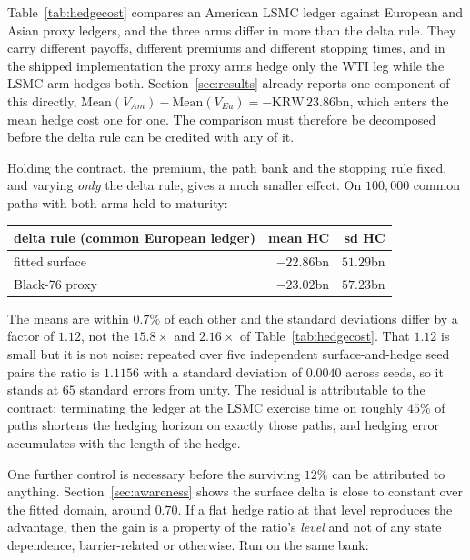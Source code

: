 \documentclass[11pt,a4paper]{article}
\begin{document}
Table~\ref{tab:hedgecost} compares an American LSMC ledger against European and Asian proxy ledgers, and the three arms differ in more than the delta rule. They carry different payoffs, different premiums and different stopping times, and in the shipped implementation the proxy arms hedge only the WTI leg while the LSMC arm hedges both. Section~\ref{sec:results} already reports one component of this directly, $\mathrm{Mean}(V_{Am})-\mathrm{Mean}(V_{Eu})=-\mathrm{KRW}\,23.86$bn, which enters the mean hedge cost one for one. The comparison must therefore be decomposed before the delta rule can be credited with any of it.

Holding the contract, the premium, the path bank and the stopping rule fixed, and varying \emph{only} the delta rule, gives a much smaller effect. On $100{,}000$ common paths with both arms held to maturity:

\begin{center}
\small
\begin{tabular}{lrr}
\toprule
delta rule (common European ledger) & mean HC & sd HC \\
\midrule
fitted surface & $-22.86$bn & $51.29$bn \\
Black-76 proxy & $-23.02$bn & $57.23$bn \\
\bottomrule
\end{tabular}
\end{center}

\noindent The means are within $0.7\%$ of each other and the standard deviations differ by a factor of $1.12$, not the $15.8\times$ and $2.16\times$ of Table~\ref{tab:hedgecost}. That $1.12$ is small but it is not noise: repeated over five independent surface-and-hedge seed pairs the ratio is $1.1156$ with a standard deviation of $0.0040$ across seeds, so it stands at $65$ standard errors from unity. The residual is attributable to the contract: terminating the ledger at the LSMC exercise time on roughly $45\%$ of paths shortens the hedging horizon on exactly those paths, and hedging error accumulates with the length of the hedge.

One further control is necessary before the surviving $12\%$ can be attributed to anything. Section~\ref{sec:awareness} shows the surface delta is close to constant over the fitted domain, around $0.70$. If a flat hedge ratio at that level reproduces the advantage, then the gain is a property of the ratio's \emph{level} and not of any state dependence, barrier-related or otherwise. Run on the same bank:
\end{document}
